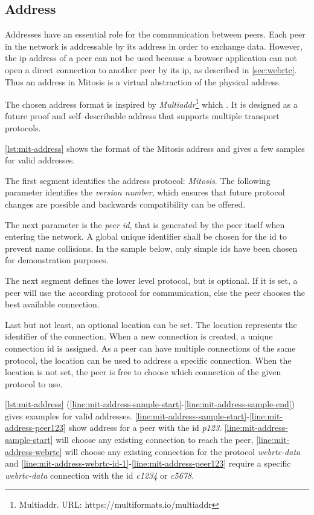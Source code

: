 \subsection{Address}\label{sec:mit-address}
Addresses have an essential role for the communication between peers. Each peer in the network is addressable by its address in order to exchange data. 
However, the \gls{ip} address of a peer can not be used because a browser application can not open a direct connection to another peer by its \gls{ip}, as described in \vref{sec:webrtc}. 
Thus an address in Mitosis is a virtual abstraction of the physical address. 

The chosen address format is inspired by \textit{Multiaddr}\footnote{Multiaddr. URL: {https://multiformats.io/multiaddr}} which  \citet{multiaddr}. It is designed as a future proof and self–describable address that supports multiple transport protocols. 

\vref{lst:mit-address} shows the format of the Mitosis address and gives a few samples for valid addresses.

The first segment identifies the address protocol: \textit{Mitosis}. The following parameter identifies the \textit{version number}, which ensures that future protocol changes are possible and backwards compatibility can be offered.

The next parameter is the \textit{peer id}, that is generated by the peer itself when entering the network. A global unique identifier shall be chosen for the id to prevent name collisions. In the sample below, only simple ids have been chosen for demonstration purposes. 

The next segment defines the lower level protocol, but is optional. If it is set, a peer will use the according protocol for communication, else the peer chooses the best available connection.

Last but not least, an optional location can be set. The location represents the identifier of the connection. When a new connection is created, a unique connection id is assigned. As a peer can have multiple connections of the same protocol, the location can be used to address a specific connection. When the location is not set, the peer is free to choose which connection of the given protocol to use.

\vref{lst:mit-address} (\cref{line:mit-address-sample-start}-\cref{line:mit-address-sample-end}) gives examples for valid addresses. \cref{line:mit-address-sample-start}-\cref{line:mit-address-peer123} show address for a peer with the id \textit{p123}. \cref{line:mit-address-sample-start} will choose any existing connection to reach the peer, \cref{line:mit-address-webrtc} will choose any existing connection for the protocol \textit{webrtc-data} and \cref{line:mit-address-webrtc-id-1}-\cref{line:mit-address-peer123} require a specific \textit{webrtc-data} connection with the id \textit{c1234} or \textit{c5678}.

